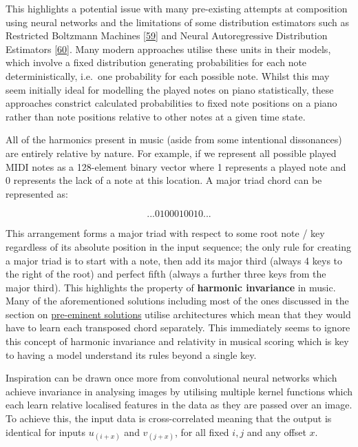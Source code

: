 \documentclass[12pt,]{article}
\begin{document}
This highlights a potential issue with many pre-existing attempts at
composition using neural networks and the limitations of some
distribution estimators such as Restricted Boltzmann Machines
{[}\protect\hyperlink{ref-sutskever2009recurrent}{59}{]} and Neural
Autoregressive Distribution Estimators
{[}\protect\hyperlink{ref-uria2016neural}{60}{]}. Many modern approaches
utilise these units in their models, which involve a fixed distribution
generating probabilities for each note deterministically, i.e.~one
probability for each possible note. Whilst this may seem initially ideal
for modelling the played notes on piano statistically, these approaches
constrict calculated probabilities to fixed note positions on a piano
rather than note positions relative to other notes at a given time
state.

All of the harmonics present in music (aside from some intentional
dissonances) are entirely relative by nature. For example, if we
represent all possible played MIDI notes as a 128-element binary vector
where 1 represents a played note and 0 represents the lack of a note at
this location. A major triad chord can be represented as:

\[... 0100010010 ...\]

This arrangement forms a major triad with respect to some root note /
key regardless of its absolute position in the input sequence; the only
rule for creating a major triad is to start with a note, then add its
major third (always 4 keys to the right of the root) and perfect fifth
(always a further three keys from the major third). This highlights the
property of \textbf{harmonic invariance} in music. Many of the
aforementioned solutions including most of the ones discussed in the
section on \protect\hyperlink{competitiveexistingsolutions}{pre-eminent
solutions} utilise architectures which mean that they would have to
learn each transposed chord separately. This immediately seems to ignore
this concept of harmonic invariance and relativity in musical scoring
which is key to having a model understand its rules beyond a single key.

Inspiration can be drawn once more from convolutional neural networks
which achieve invariance in analysing images by utilising multiple
kernel functions which each learn relative localised features in the
data as they are passed over an image. To achieve this, the input data
is cross-correlated meaning that the output is identical for inputs
\(u_{(i + x)}\) and \(v_{(j+x)}\), for all fixed \(i,j\) and any offset
\(x\).
\end{document}
